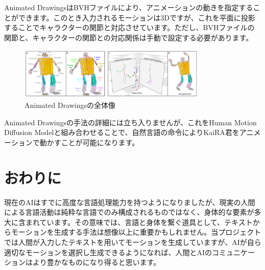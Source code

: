 Animated DrawingsはBVHファイルにより、アニメーションの動きを指定することができます。このとき入力されるモーションは3Dですが、これを平面に投影することでキャラクターの関節と対応させています。ただし、BVHファイルの関節と、キャラクターの関節との対応関係は手動で設定する必要があります。

\begin{figure}[htbp]
    \centering
    \includegraphics[width=0.8\textwidth]{moving-kaira-kun/fig/animated_drawings.png}
    \caption{Animated Drawingsの全体像}
    \label{fig:animated_drawings}
\end{figure}

Animated Drawingsの手法の詳細には立ち入りませんが、これをHuman Motion Diffusion Modelと組み合わせることで、自然言語の命令によりKaiRA君をアニメーションで動かすことが可能になります。

\section{おわりに}

現在のAIはすでに高度な言語処理能力を持つようになりましたが、現実の人間による言語活動は純粋な言語でのみ構成されるものではなく、身体的な要素が多大に含まれています。その意味では、言語と身体を繋ぐ道具として、テキストからモーションを生成する手法は想像以上に重要かもしれません。当プロジェクトでは人間が入力したテキストを用いてモーションを生成していますが、AIが自ら適切なモーションを選択し生成できるようになれば、人間とAIのコミュニケーションはより豊かなものになり得ると思います。
